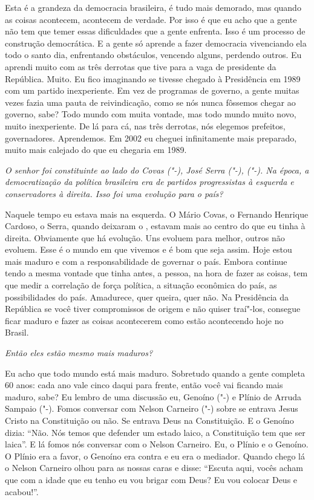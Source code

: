Esta é a grandeza da democracia brasileira, é tudo mais demorado, mas
quando as coisas acontecem, acontecem de verdade. Por isso é que eu acho
que a gente não tem que temer essas dificuldades que a gente enfrenta.
Isso é um processo de construção democrática. E a gente só aprende a
fazer democracia vivenciando ela todo o santo dia, enfrentando
obstáculos, vencendo alguns, perdendo outros. Eu aprendi muito com as
três derrotas que tive para a vaga de presidente da República. Muito. Eu
fico imaginando se tivesse chegado à Presidência em 1989 com um partido
inexperiente. Em vez de programas de governo, a gente muitas vezes fazia
uma pauta de reivindicação, como se nós nunca fôssemos chegar ao
governo, sabe? Todo mundo com muita vontade, mas todo mundo muito novo,
muito inexperiente. De lá para cá, nas três derrotas, nós elegemos
prefeitos, governadores. Aprendemos. Em 2002 eu cheguei infinitamente
mais preparado, muito mais calejado do que eu chegaria em 1989.

\medskip

\noindent\emph{O senhor foi constituinte ao lado do Covas ("-), José Serra
("-),  ("-). Na época, a democratização da política
brasileira era de partidos progressistas à esquerda e conservadores à
direita. Isso foi uma evolução para o país?}

Naquele tempo eu estava mais na esquerda. O Mário Covas,
o Fernando Henrique Cardoso, o Serra, quando deixaram o , estavam
mais ao centro do que eu tinha à direita. Obviamente que há evolução.
Uns evoluem para melhor, outros não evoluem. Esse é o mundo em que
vivemos e é bom que seja assim. Hoje estou mais maduro e com a
responsabilidade de governar o país. Embora continue tendo a mesma
vontade que tinha antes, a pessoa, na hora de fazer as coisas, tem que
medir a correlação de força política, a situação econômica do país, as
possibilidades do país. Amadurece, quer queira, quer não. Na Presidência
da República se você tiver compromissos de origem e não quiser traí"-los,
consegue ficar maduro e fazer as coisas acontecerem como estão
acontecendo hoje no Brasil.

\medskip

\noindent\emph{Então eles estão mesmo mais maduros?}

Eu acho que todo mundo está mais maduro. Sobretudo quando
a gente completa 60 anos: cada ano vale cinco daqui para frente, então
você vai ficando mais maduro, sabe? Eu lembro de uma discussão eu,
Genoíno ("-) e Plínio de Arruda Sampaio ("-). Fomos conversar com
Nelson Carneiro ("-) sobre se entrava Jesus Cristo na Constituição
ou não. Se entrava Deus na Constituição. E o Genoíno dizia: ``Não. Nós
temos que defender um estado laico, a Constituição tem que ser laica''.
E lá fomos nós conversar com o Nelson Carneiro. Eu, o Plínio e o
Genoíno. O Plínio era a favor, o Genoíno era contra e eu era o mediador.
Quando chego lá o Nelson Carneiro olhou para as nossas caras e disse:
``Escuta aqui, vocês acham que com a idade que eu tenho eu vou brigar com
Deus? Eu vou colocar Deus e acabou!''.

